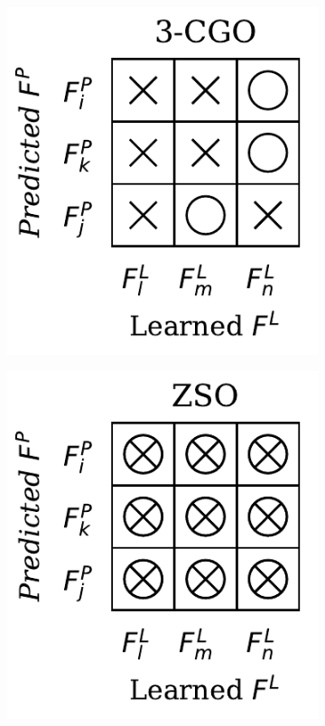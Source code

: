 \begin{figure}[H]
\begin{subfigure}[b]{0.17\textwidth}
        \end{subfigure}
        \hfill
        \begin{subfigure}[b]{0.17\textwidth}
            \includegraphics[width=\textwidth]{img/datasets/_3-CGO.pdf}
        \end{subfigure}
        \hfill
        \begin{subfigure}[b]{0.17\textwidth}
            \includegraphics[width=\textwidth]{img/datasets/_ZSO.pdf}
        \end{subfigure}
        

\end{figure}
